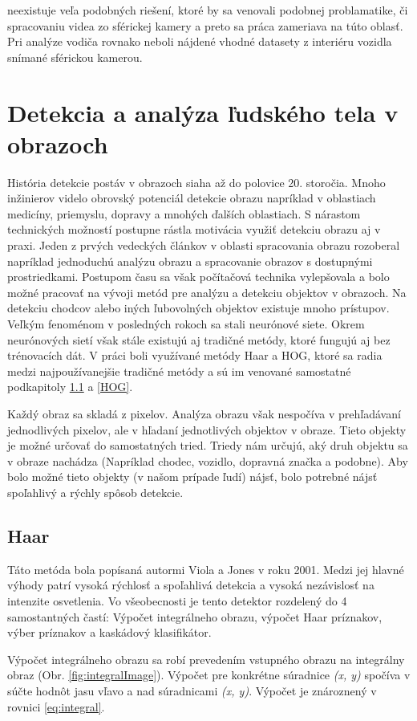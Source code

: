 \documentclass[slovak,master,dept460,male,cpp,cpdeclaration]{diploma}
\begin{document}
neexistuje veľa podobných riešení, ktoré by sa venovali podobnej problamatike, či spracovaniu videa zo sférickej kamery a preto sa práca zameriava na túto oblasť. Pri analýze vodiča rovnako neboli nájdené vhodné datasety z interiéru vozidla snímané sférickou kamerou.




\newpage
\section{Detekcia a analýza ľudského tela v obrazoch}
\label{sec:human body decection}

História detekcie postáv v obrazoch siaha až do polovice 20. storočia. Mnoho inžinierov videlo obrovský potenciál detekcie obrazu napríklad v oblastiach medicíny, priemyslu, dopravy a mnohých ďalších oblastiach. S nárastom technických možností postupne rástla motivácia využiť detekciu obrazu aj v praxi. Jeden z prvých vedeckých článkov v oblasti spracovania obrazu \cite{rosenfeld1969} rozoberal napríklad jednoduchú analýzu  obrazu a spracovanie obrazov s dostupnými prostriedkami.  Postupom času sa však počítačová technika vylepšovala a bolo možné pracovať na vývoji metód pre analýzu  a detekciu objektov v obrazoch. Na detekciu chodcov alebo iných ľubovolných objektov existuje mnoho prístupov. Veľkým fenoménom v posledných rokoch sa stali neurónové siete. Okrem neurónových sietí však stále existujú aj tradičné metódy, ktoré fungujú aj bez trénovacích dát. V práci boli využívané metódy Haar a HOG, ktoré sa radia medzi najpoužívanejšie tradičné metódy a sú im venované samostatné podkapitoly \ref{Haar} a \ref{HOG}.\par
Každý obraz sa skladá z pixelov. Analýza obrazu však nespočíva v prehľadávaní jednodlivých pixelov, ale v hľadaní jednotlivých objektov v obraze. Tieto objekty je možné  určovať do  samostatných tried. Triedy nám určujú, aký druh objektu sa v obraze nachádza (Napríklad chodec, vozidlo, dopravná značka a podobne). Aby bolo možné tieto objekty (v našom prípade ľudí) nájsť, bolo potrebné nájsť spoľahlivý a rýchly spôsob detekcie. 


\subsection{Haar}
\label{Haar}
Táto metóda bola popísaná autormi Viola a Jones\cite{viola2001rapid} v roku 2001. Medzi jej hlavné výhody patrí vysoká rýchlosť  a spoľahlivá detekcia a vysoká nezávislosť na intenzite osvetlenia. Vo všeobecnosti je tento detektor rozdelený do 4 samostantných častí: Výpočet integrálneho obrazu,  výpočet Haar príznakov, výber príznakov a kaskádový klasifikátor.\par Výpočet integrálneho obrazu sa robí prevedením vstupného obrazu na integrálny obraz (Obr. \ref{fig:integralImage}). Výpočet pre konkrétne súradnice \textit{(x, y)} spočíva v súčte hodnôt jasu vľavo a nad súradnicami  \textit{(x, y)}. Výpočet je znároznený v rovnici \ref{eq:integral}.
\end{document}
